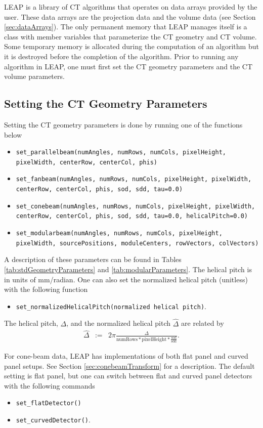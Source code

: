 \documentclass[11pt]{article}
\begin{document}
LEAP is a library of CT algorithms that operates on data arrays provided by the user.  These data arrays are the projection data and the volume data (see Section \ref{sec:dataArrays}).  The only permanent memory that LEAP manages itself is a class with member variables that parameterize the CT geometry and CT volume.  Some temporary memory is allocated during the computation of an algorithm but it is destroyed before the completion of the algorithm.  Prior to running any algorithm in LEAP, one must first set the CT geometry parameters and the CT volume parameters.

\subsection{Setting the CT Geometry Parameters}

Setting the CT geometry parameters is done by running one of the functions below
\begin{itemize}
\item[] \texttt{set\_parallelbeam(numAngles, numRows, numCols, pixelHeight, pixelWidth, centerRow, centerCol, phis)}
\item[] \texttt{set\_fanbeam(numAngles, numRows, numCols, pixelHeight, pixelWidth, centerRow, centerCol, phis, sod, sdd, tau=0.0)}
\item[] \texttt{set\_conebeam(numAngles, numRows, numCols, pixelHeight, pixelWidth, centerRow, centerCol, phis, sod, sdd, tau=0.0, helicalPitch=0.0)}
\item[] \texttt{set\_modularbeam(numAngles, numRows, numCols, pixelHeight, pixelWidth, sourcePositions, moduleCenters, rowVectors, colVectors)}
\end{itemize}
A description of these parameters can be found in Tables \ref{tab:stdGeometryParameters} and \ref{tab:modularParameters}.  The helical pitch is in units of mm/radian.  One can also set the normalized helical pitch (unitless) with the following function
\begin{itemize}
    \item[] \texttt{set\_normalizedHelicalPitch(normalized helical pitch)}.
\end{itemize}
The helical pitch, $\Delta$, and the normalized helical pitch $\widehat{\Delta}$ are related by
\begin{eqnarray*}
\widehat{\Delta} &:=& 2\pi \frac{\Delta}{\text{numRows} * \text{pixelHeight} * \frac{\text{sod}}{\text{sdd}}}.
\end{eqnarray*}

For cone-beam data, LEAP has implementations of both flat panel and curved panel setups.  See Section \ref{sec:conebeamTransform} for a description.  The default setting is flat panel, but one can switch between flat and curved panel detectors with the following commands
\begin{itemize}
\item[] \texttt{set\_flatDetector()}
\item[] \texttt{set\_curvedDetector()}.
\end{itemize}
\end{document}

